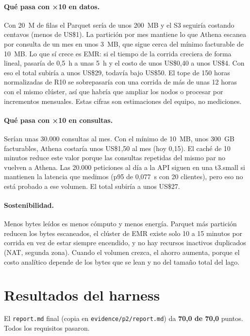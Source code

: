 \documentclass[11pt,letterpaper]{article}
\begin{document}
\paragraph{Qué pasa con ×10 en datos.} Con 20~M de filas el Parquet sería de unos 200~MB y el S3 seguiría costando centavos (menos de US\$1). La partición por mes mantiene lo que Athena escanea por consulta de un mes en unos 3~MB, que sigue cerca del mínimo facturable de 10~MB. Lo que sí crece es EMR: si el tiempo de la corrida creciera de forma lineal, pasaría de 0,5~h a unas 5~h y el costo de unos US\$0,40 a unos US\$4. Con eso el total subiría a unos US\$29, todavía bajo US\$50. El tope de 150 horas normalizadas de R10 se sobrepasaría con una corrida de más de unas 12 horas con el mismo clúster, así que habría que ampliar los nodos o procesar por incrementos mensuales. Estas cifras son estimaciones del equipo, no mediciones.

\paragraph{Qué pasa con ×10 en consultas.} Serían unas 30.000 consultas al mes. Con el mínimo de 10~MB, unos 300~GB facturables, Athena costaría unos US\$1,50 al mes (hoy 0,15). El caché de 10 minutos reduce este valor porque las consultas repetidas del mismo par no vuelven a Athena. Las 20.000 peticiones al día a la API siguen en una t3.small si mantienen la latencia que medimos (p95 de 0,077~s con 20 clientes), pero eso no está probado a ese volumen. El total subiría a unos US\$27.

\paragraph{Sostenibilidad.} Menos bytes leídos es menos cómputo y menos energía. Parquet más partición reducen los bytes escaneados, el clúster de EMR existe solo 10 a 15 minutos por corrida en vez de estar siempre encendido, y no hay recursos inactivos duplicados (NAT, segunda zona). Cuando el volumen crezca, el ahorro aumenta, porque el costo analítico depende de los bytes que se lean y no del tamaño total del lago.

\section{Resultados del harness}
\label{sec:harness}
El \texttt{report.md} final (copia en \texttt{evidence/p2/report.md}) da \textbf{70,0 de 70,0} puntos. Todos los requisitos pasaron.
\end{document}
